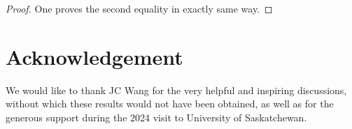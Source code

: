 \documentclass{amsart}
\begin{document}
\begin{proof}
One proves the second equality in exactly same way.
\end{proof}
\section*{Acknowledgement}
We would like to thank JC Wang for the very helpful and inspiring discussions, without which these results would not have been obtained, as well as for the generous support during the 2024 visit to University of Saskatchewan.

\bigskip


		
	







%
\end{document}
